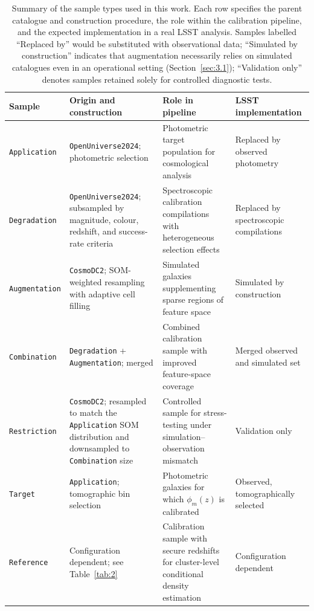 \begin{table}
    \centering
    \begin{tabular}{p{2.4cm}p{4.2cm}p{5.8cm}p{3.2cm}}
        \toprule
        Sample & Origin and construction & Role in pipeline & LSST implementation \\
        \midrule
        \texttt{Application} & \texttt{OpenUniverse2024}; photometric selection & Photometric target population for cosmological analysis & Replaced by observed photometry \\
        \texttt{Degradation} & \texttt{OpenUniverse2024}; subsampled by magnitude, colour, redshift, and success-rate criteria & Spectroscopic calibration compilations with heterogeneous selection effects & Replaced by spectroscopic compilations \\
        \texttt{Augmentation} & \texttt{CosmoDC2}; SOM-weighted resampling with adaptive cell filling & Simulated galaxies supplementing sparse regions of feature space & Simulated by construction \\
        \texttt{Combination} & \texttt{Degradation} + \texttt{Augmentation}; merged & Combined calibration sample with improved feature-space coverage & Merged observed and simulated set \\
        \texttt{Restriction} & \texttt{CosmoDC2}; resampled to match the \texttt{Application} SOM distribution and downsampled to \texttt{Combination} size & Controlled sample for stress-testing under simulation--observation mismatch & Validation only \\
        \texttt{Target} & \texttt{Application}; tomographic bin selection & Photometric galaxies for which \(\phi_m(z)\) is calibrated & Observed, tomographically selected \\
        \texttt{Reference} & Configuration dependent; see Table~\ref{tab:2} & Calibration sample with secure redshifts for cluster-level conditional density estimation & Configuration dependent \\
        \bottomrule
    \end{tabular}
    \caption{Summary of the sample types used in this work. Each row specifies the parent catalogue and construction procedure, the role within the calibration pipeline, and the expected implementation in a real LSST analysis. Samples labelled ``Replaced by'' would be substituted with observational data; ``Simulated by construction'' indicates that augmentation necessarily relies on simulated catalogues even in an operational setting (Section~\ref{sec:3.1}); ``Validation only'' denotes samples retained solely for controlled diagnostic tests.}
\label{tab:1}
\end{table}

